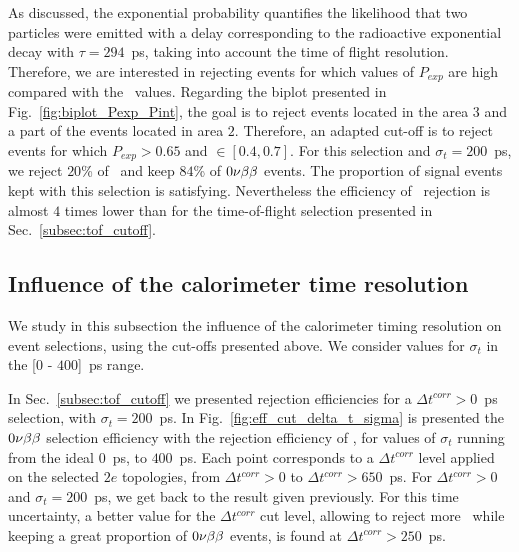 As discussed, the exponential probability quantifies the likelihood that two particles were emitted with a delay corresponding to the radioactive exponential decay with ${\tau=294}$~ps, taking into account the time of flight resolution.
Therefore, we are interested in rejecting events for which values of $P_{exp}$ are high compared with the \Pint\ values.
Regarding the biplot presented in Fig.~\ref{fig:biplot_Pexp_Pint}, the goal is to reject events located in the area $3$ and a part of the events located in area $2$.
Therefore, an adapted cut-off is to reject events for which ${P_{exp}>0.65}$ and \Pint$\in[0.4,0.7]$.
For this selection and ${\sigma_{t}=200}$~ps, we reject $20$\% of \Tl\ and keep $84$\% of $0\nu\beta\beta$ events.
The proportion of signal events kept with this selection is satisfying.
Nevertheless the efficiency of \Tl\ rejection is almost $4$ times lower than for the time-of-flight selection presented in Sec.~\ref{subsec:tof_cutoff}.



\subsection{Influence of the calorimeter time resolution}
\label{subsec:calo_sigma}

We study in this subsection the influence of the calorimeter timing resolution on event selections, using the cut-offs presented above.
We consider values for $\sigma_{t}$ in the [$0$ - $400$]~ps range.

In Sec.~\ref{subsec:tof_cutoff} we presented rejection efficiencies for a ${\Delta t^{corr}>0}$~ps selection, with ${\sigma_{t}=200}$~ps.
In Fig.~\ref{fig:eff_cut_delta_t_sigma} is presented the $0\nu\beta\beta$ selection efficiency with the rejection efficiency of \Tl, for values of $\sigma_{t}$ running from the ideal $0$~ps, to $400$~ps.
Each point corresponds to a $\Delta t^{corr}$ level applied on the selected $2e$ topologies, from ${\Delta t^{corr}>0}$ to ${\Delta t^{corr}>650}$~ps.
For ${\Delta t^{corr}>0}$ and $\sigma_{t}=200$~ps, we get back to the result given previously.
For this time uncertainty, a better value for the $\Delta t^{corr}$ cut level, allowing to reject more \Tl\ while keeping a great proportion of $0\nu\beta\beta$ events, is found at ${\Delta t^{corr}>250}$~ps.

